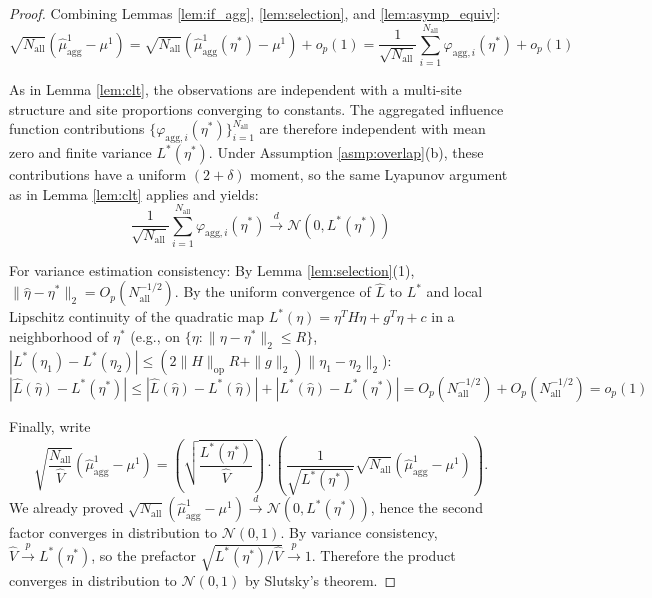 \documentclass{article}
\begin{document}
\begin{proof}
Combining Lemmas \ref{lem:if_agg}, \ref{lem:selection}, and \ref{lem:asymp_equiv}:
\[
\sqrt{N_{\mathrm{all}}}(\widehat{\mu}^1_{\text{agg}} - \mu^1) = \sqrt{N_{\mathrm{all}}}(\widehat{\mu}^1_{\text{agg}}(\eta^*) - \mu^1) + o_p(1) = \frac{1}{\sqrt{N_{\mathrm{all}}}} \sum_{i=1}^{N_{\mathrm{all}}} \varphi_{\mathrm{agg},i}(\eta^*) + o_p(1)
\]

As in Lemma \ref{lem:clt}, the observations are independent with a multi-site structure and site proportions converging to constants. The aggregated influence function contributions $\{\varphi_{\mathrm{agg},i}(\eta^*)\}_{i=1}^{N_{\mathrm{all}}}$ are therefore independent with mean zero and finite variance $L^*(\eta^*)$. Under Assumption \ref{asmp:overlap}(b), these contributions have a uniform $(2+\delta)$ moment, so the same Lyapunov argument as in Lemma \ref{lem:clt} applies and yields:
\[
\frac{1}{\sqrt{N_{\mathrm{all}}}} \sum_{i=1}^{N_{\mathrm{all}}} \varphi_{\mathrm{agg},i}(\eta^*) \xrightarrow{d} \mathcal{N}(0, L^*(\eta^*))
\]

For variance estimation consistency: By Lemma \ref{lem:selection}(1), $\|\widehat{\eta} - \eta^*\|_2 = O_p(N_{\mathrm{all}}^{-1/2})$. By the uniform convergence of $\widehat{L}$ to $L^*$ and local Lipschitz continuity of the quadratic map $L^*(\eta)=\eta^T H\eta+g^T\eta+c$ in a neighborhood of $\eta^*$ (e.g., on $\{\eta:\|\eta-\eta^*\|_2\le R\}$,
$|L^*(\eta_1)-L^*(\eta_2)|\le (2\|H\|_{\mathrm{op}}R+\|g\|_2)\|\eta_1-\eta_2\|_2$):
\[
|\widehat{L}(\widehat{\eta}) - L^*(\eta^*)| \le |\widehat{L}(\widehat{\eta}) - L^*(\widehat{\eta})| + |L^*(\widehat{\eta}) - L^*(\eta^*)| = O_p(N_{\mathrm{all}}^{-1/2}) + O_p(N_{\mathrm{all}}^{-1/2}) = o_p(1)
\]

Finally, write
\[
\sqrt{\frac{N_{\mathrm{all}}}{\widehat{V}}}\left(\widehat{\mu}^1_{\text{agg}}-\mu^1\right)
=
\left(\sqrt{\frac{L^*(\eta^*)}{\widehat{V}}}\right)\cdot
\left(\frac{1}{\sqrt{L^*(\eta^*)}}\sqrt{N_{\mathrm{all}}}\left(\widehat{\mu}^1_{\text{agg}}-\mu^1\right)\right).
\]
We already proved $\sqrt{N_{\mathrm{all}}}(\widehat{\mu}^1_{\text{agg}}-\mu^1)\xrightarrow{d}\mathcal{N}(0,L^*(\eta^*))$, hence the second factor converges in distribution to $\mathcal{N}(0,1)$.
By variance consistency, $\widehat{V}\xrightarrow{p}L^*(\eta^*)$, so the prefactor $\sqrt{L^*(\eta^*)/\widehat{V}}\xrightarrow{p}1$.
Therefore the product converges in distribution to $\mathcal{N}(0,1)$ by Slutsky's theorem.
\end{proof}
\end{document}
